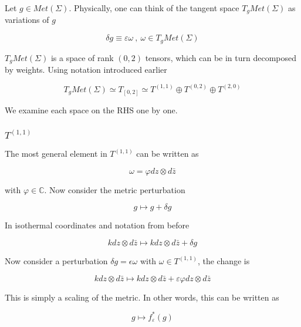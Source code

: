 Let $g \in Met(\Sigma)$. Physically, one can think of the tangent space $T_g Met(\Sigma)$ as variations of $g$

\begin{equation}
    \delta g \equiv \varepsilon \omega~,~ \omega \in T_g Met(\Sigma)
\end{equation}


$T_g Met(\Sigma)$ is a space of rank $(0, 2)$ tensors, which can be in turn decomposed by weights. Using notation introduced earlier

\begin{equation}
    T_g Met(\Sigma) \simeq T_{[0, 2]} \simeq T^{(1, 1)} \oplus T^{(0, 2)} \oplus T^{(2, 0)}
\end{equation}

We examine each space on the RHS one by one.

\subsubsection{$T^{(1, 1)}$}

    The most general element in $T^{(1, 1)}$ can be written as

    \begin{equation}
        \omega = \varphi dz \otimes d\bar z
    \end{equation}

    with $\varphi \in \mathbb C$. Now consider the metric perturbation

    \begin{equation}
        g \mapsto g + \delta g
    \end{equation}

    In isothermal coordinates and notation from before

    \begin{equation}
        k dz \otimes d\bar z \mapsto k dz \otimes d\bar z + \delta g
    \end{equation}

    Now consider a perturbation $\delta g = \epsilon \omega$ with $\omega \in T^{(1, 1)}$, the change is

    \begin{equation}
        k dz \otimes d\bar z \mapsto k dz \otimes d\bar z +  \varepsilon \varphi dz \otimes d\bar z
    \end{equation}


    This is simply a scaling of the metric. In other words, this can be written as

    \begin{equation}
        g \mapsto f_\varepsilon^* (g)
    \end{equation}

